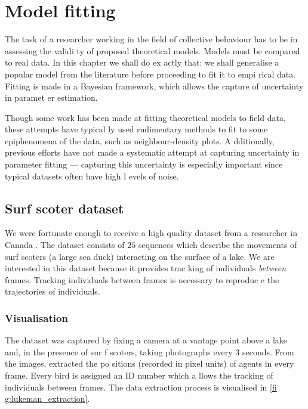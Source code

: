 \graphicspath{{fig/model_fitting/}}

\chapter{Model fitting}	
\label{cha:model_fitting}

The task of a researcher working in the field of collective behaviour has to be in assessing the validi
ty of proposed theoretical models. Models must be compared to real data. In this chapter we shall do ex
actly that: we shall generalise a popular model from the literature before proceeding to fit it to empi
rical data. Fitting is made in a Bayesian framework, which allows the capture of uncertainty in paramet
er estimation.

Though some work has been made at fitting theoretical models to field data, these attempts have typical
ly used rudimentary methods to fit to some epiphenomena of the data, such as neighbour-density plots. A
dditionally, previous efforts have not made a systematic attempt at capturing uncertainty in parameter 
fitting --- capturing this uncertainty is especially important since typical datasets often have high l
evels of noise.

\section{Surf scoter dataset}
\label{sec:surf_data}

We were fortunate enough to receive a high quality dataset from a researcher in Canada \parencite{lukem
an10}. The dataset consists of $25$ sequences which describe the movements of surf scoters (a large sea
 duck) interacting on the surface of a lake. We are interested in this dataset because it provides trac
king of individuals \emph{between} frames. Tracking individuals between frames is necessary to reproduc
e the trajectories of individuals.

\subsection{Visualisation}

The dataset was captured by fixing a camera at a vantage point above a lake and, in the presence of sur
f scoters, taking photographs every $3$ seconds. From the images, \textcite{lukeman10} extracted the po
sitions (recorded in pixel units) of agents in every frame. Every bird is assigned an ID number which a
llows the tracking of individuals between frames. The data extraction process is visualised in \cref{fi
g:lukeman_extraction}.

